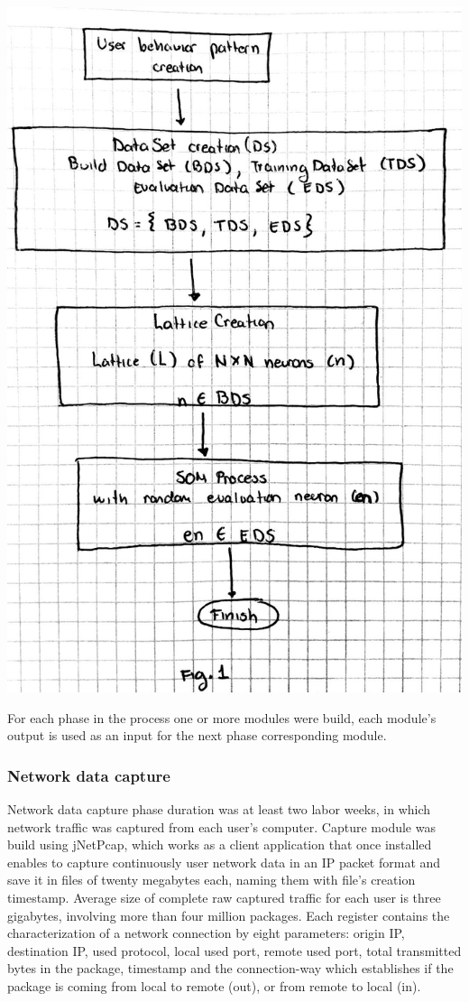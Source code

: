 \documentclass{article}
\begin{document}
	\begin{center}\includegraphics[scale=0.2]{fig-two} \end{center}

For each phase in the process one or more modules were build, each module's output is used as an input for the next phase corresponding module.


\subsubsection{Network data capture} %
Network data capture phase duration was at least two labor weeks,  in which network traffic was captured from each user's computer.
Capture module was build using jNetPcap, which works as a client application that once installed enables to capture continuously user network data in an IP packet format and save it in files of twenty megabytes each, naming them with file's creation timestamp. Average size of complete raw captured traffic for each user is three gigabytes, involving more than four million packages. Each register contains the characterization of a network connection by eight parameters: origin IP, destination IP, used protocol, local used port, remote used port, total transmitted bytes in the package, timestamp and the connection-way which establishes if the package is coming from local to remote (out), or from remote to local (in).
\end{document}
